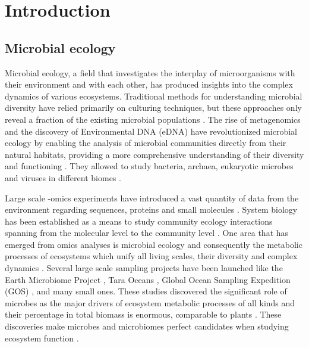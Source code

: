 % 
% 

\chapter{Introduction}
\label{cha:intro}

\section{Microbial ecology}
\label{sec:microbial_ecology}

Microbial ecology, a field that investigates the interplay of microorganisms with
their environment and with each other, has produced insights into
the complex dynamics of various ecosystems.
Traditional methods for understanding microbial diversity have relied primarily
on culturing techniques, but these approaches only reveal a fraction of the
existing microbial populations \parencite{prosser2020Conceptual}.
The rise of metagenomics and the discovery of
Environmental DNA (eDNA) have revolutionized microbial ecology by enabling the
analysis of microbial communities directly from their natural habitats,
providing a more comprehensive understanding of their diversity and
functioning \parencite{raes2008Molecular}. They allowed to 
study bacteria, archaea, eukaryotic microbes and viruses in different biomes \parencite{nayfach2021a-genomic}.

Large scale -omics experiments have introduced a vast quantity of data from the
environment regarding sequences, proteins and small molecules \parencite{shaffer2022Standardized}.
System biology has been established as a means to study community ecology interactions spanning
from the molecular level to the community level \parencite{raes2008Molecular}.
One area that has emerged from omics analyses is microbial ecology and
consequently the metabolic processes of ecosystems \parencite{perez_garcia2016Metabolic}
which unify all living scales, their diversity and complex dynamics \parencite{smith2016Origin}.
Several large scale sampling projects have been launched like the Earth
Microbiome Project \parencite{thompson2017a-communal}, Tara Oceans \parencite{sunagawa2020tara},
Global Ocean Sampling Expedition (GOS) \parencite{Shibu2007}, and
many small ones. These studies discovered the significant role of microbes as the major drivers of ecosystem metabolic
processes of all kinds \parencite{falkowski2008microbial,hall2018understanding} and
their percentage in total biomass is enormous, comparable to plants \parencite{bar2018biomass}.
These discoveries make microbes and microbiomes perfect candidates when
studying ecosystem function \parencite{klitgord2011Ecosystems,widder2016Challenges}.

